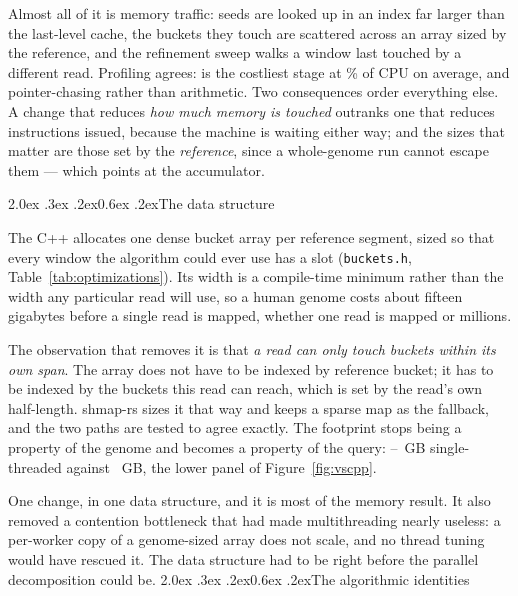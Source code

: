 \documentclass[10pt,a4paper,twocolumn]{article}
\makeatletter
\renewcommand\section{\@startsection{section}{1}{0pt}%
  {2.0ex \@plus .3ex \@minus .2ex}{0.6ex \@plus.2ex}{\normalsize\bfseries}}
\makeatother
\begin{document}
Almost all of it is memory traffic: seeds are looked up in an index far larger
than the last-level cache, the buckets they touch are scattered across an array
sized by the reference, and the refinement sweep walks a window last touched by
a different read. Profiling agrees: \texttt{\shmTopStage} is the costliest
stage at \shmTopStageShare\% of CPU on average, and pointer-chasing rather than
arithmetic. Two consequences order everything else. A change that reduces
\emph{how much memory is touched} outranks one that reduces instructions
issued, because the machine is waiting either way; and the sizes that matter
are those set by the \emph{reference}, since a whole-genome run cannot escape
them --- which points at the accumulator.

\section{The data structure}

The C++ allocates one dense bucket array per reference segment, sized so that
every window the algorithm could ever use has a slot (\texttt{buckets.h},
Table~\ref{tab:optimizations}). Its width is a compile-time minimum rather than
the width any particular read will use, so a human genome costs about fifteen
gigabytes before a single read is mapped, whether one read is mapped or
millions.

The observation that removes it is that \emph{a read can only touch buckets
within its own span}. The array does not have to be indexed by reference
bucket; it has to be indexed by the buckets this read can reach, which is set by
the read's own half-length. shmap-rs sizes it that way and keeps a sparse map as
the fallback, and the two paths are tested to agree exactly. The footprint stops
being a property of the genome and becomes a property of the query:
\shmRssRsMin--\shmRssRsMax~GB single-threaded against \shmRssCpp~GB, the lower
panel of Figure~\ref{fig:vscpp}.



One change, in one data structure, and it is most of the memory result. It also
removed a contention bottleneck that had made multithreading nearly useless: a
per-worker copy of a genome-sized array does not scale, and no thread tuning
would have rescued it. The data structure had to be right before the parallel
decomposition could be.
\section{The algorithmic identities}
\end{document}
